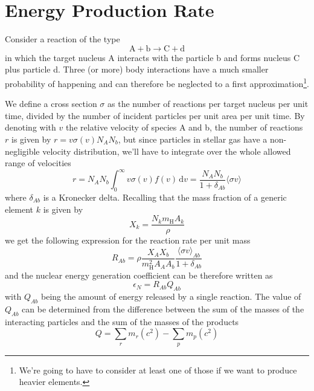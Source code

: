 \section{Energy Production Rate}
Consider a reaction of the type
\begin{equation*}
    \text{A}+\text{b}\to \text{C}+\text{d}
\end{equation*}
in which the target nucleus A interacts with the particle b and forms nucleus C plus particle d. Three (or more) body interactions have a much smaller probability of happening and can therefore be neglected to a first approximation\footnote{We're going to have to consider at least one of those if we want to produce heavier elements.}.
\par We define a cross section $\sigma$ as the number of reactions per target nucleus per unit time, divided by the number of incident particles per unit area per unit time. By denoting with $v$ the relative velocity of species A and b, the number of reactions $r$ is given by $r = v\sigma(v)N_{A}N_{b}$, but since particles in stellar gas have a non-negligible velocity distribution, we'll have to integrate over the whole allowed range of velocities
\begin{equation}
    r = N_{A}N_{b}\int_{0}^{\infty}v\sigma(v)f(v)\,\text{d}v = \frac{N_{A}N_{b}}{1+\delta_{Ab}}\langle \sigma v \rangle
    \label{eq:reactionrate}
\end{equation}
where $\delta_{Ab}$ is a Kronecker delta. Recalling that the mass fraction of a generic element $k$ is given by 
\begin{equation*}
    X_{k} = \frac{N_{k}m_{\text{H}}A_{k}}{\rho}
\end{equation*}
we get the following expression for the reaction rate per unit mass
\begin{equation}
    R_{Ab} = \rho \frac{X_{A}X_{b}}{m_{\text{H}}^{2}A_{A}A_{b}} \frac{\langle \sigma v \rangle_{Ab}}{1+\delta_{Ab}}
\end{equation}
and the nuclear energy generation coefficient can be therefore written as 
\begin{equation}
    \epsilon_{N} = R_{Ab}Q_{Ab}
\end{equation}
with $Q_{Ab}$ being the amount of energy released by a single reaction. The value of $Q_{Ab}$ can be determined from the difference between the sum of the masses of the interacting particles and the sum of the masses of the products
\begin{equation}
    Q = \sum_{r} m_{r}(c^{2}) - \sum_{p}m_{p}(c^{2})
    \label{eq:qvalue}
\end{equation}
